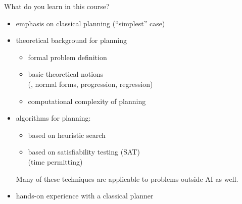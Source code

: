 \documentclass{gkibeamer}
\begin{document}
\begin{frame}{What do you learn in this course?}
  \begin{itemize}
  \item emphasis on \alert{classical} planning (``simplest'' case)
  \item \alert{theoretical background} for planning
    \begin{itemize}
    \item formal \alert{problem definition}
    \item basic \alert{theoretical notions} \\
      (\eg, normal forms, progression, regression)
    \item \alert{computational complexity} of planning
    \end{itemize}
  \item \alert{algorithms} for planning:
    \begin{itemize}
    \item based on \alert{heuristic search}
    \item based on satisfiability testing (\alert{SAT})\\
      (time permitting)
    \end{itemize}
    Many of these techniques are applicable to problems outside AI as
    well.
  \item \alert{hands-on experience} with a classical planner
  \end{itemize}
\end{frame}
\end{document}
